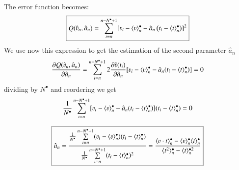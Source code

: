 The error function becomes:
\begin{equation}
\boxed{
Q(\hat{\varv}_n, \hat{a}_n) = \sum\limits_{i=n}^{n-N^\bullet+1}[ \varv_i-\langle \varv \rangle^\bullet_n - \hat{a}_n\left(t_i-\langle t \rangle^\bullet_n\right)]^2
}
\end{equation}
We use now this expression to get the estimation of the second parameter $\hat{a}_n$
\begin{equation}
\frac{\partial Q(\hat{\varv}_n, \hat{a}_n)}{\partial\hat{a}_n}=\sum\limits_{i=n}^{n-N^\bullet+1} 2\frac{\partial\hat{\varv}(t_i)}{\partial\hat{a}_n}[\varv_i-\langle \varv \rangle^\bullet_n -\hat{a}_n(t_i-\langle t\rangle^\bullet_n)]=0
\end{equation}
dividing by $N^\bullet$ and reordering we get
\begin{equation}
\frac{1}{N^\bullet}\sum\limits_{i=n}^{n-N^\bullet+1} [\varv_i-\langle \varv \rangle^\bullet_n -\hat{a}_n(t_i-\langle t\rangle^\bullet_n)](t_i-\langle t\rangle^\bullet_n)=0
\end{equation}

\begin{equation}
\boxed{
\hat{a}_n=\frac{\frac {1}{N^\bullet}\sum\limits_{i=n}^{n-N^\bullet+1}(\varv_i - \langle \varv \rangle^\bullet_n)(t_i-\langle t\rangle^\bullet_n)}{\frac {1}{N^\bullet} \sum\limits_{i=n}^{n-N^\bullet+1}(t_i- \langle t\rangle^\bullet_n)^2}=\frac{\langle \varv \cdot t\rangle^\bullet_n - \langle \varv \rangle^\bullet_n \langle t\rangle^\bullet_n}{\langle t^2\rangle^\bullet_n- \langle t \rangle^{\bullet 2}_n}
}
\label{eq:aest}
\end{equation}

